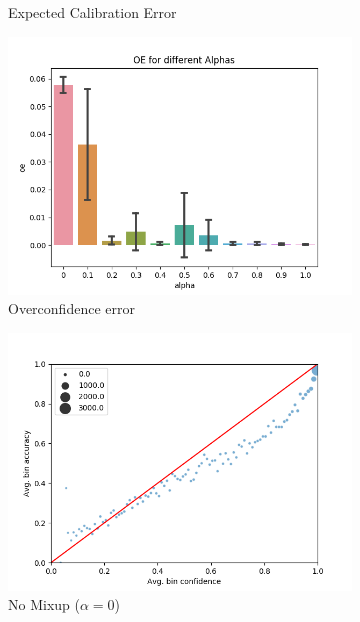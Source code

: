 \documentclass{article}
\begin{document}
\begin{figure}[h]
\begin{subfigure}[b]{0.31\textwidth}
         \caption{Expected Calibration Error}
     \end{subfigure}
     \begin{subfigure}[b]{0.31\textwidth}
         \centering
         \includegraphics[width=\textwidth]{images/cifar/oeValpha.png}
         \caption{Overconfidence error}
     \end{subfigure}
     \begin{subfigure}[b]{0.31\textwidth}
         \centering
         \noindent\includegraphics[width=\textwidth]{images/cifar/scatterplot_0.png}
         \caption{No Mixup ($\alpha=0$)}
     \end{subfigure}
     \begin{subfigure}[b]{0.31\textwidth}

\end{subfigure}
\end{figure}
\end{document}
